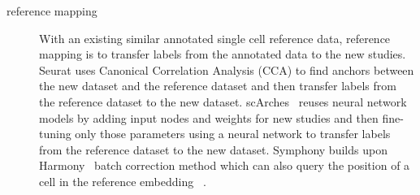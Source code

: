 \begin{description}
	\item[reference mapping] With an existing similar annotated single cell reference data, reference mapping is to transfer labels from the annotated data to the new studies. Seurat uses Canonical Correlation Analysis (CCA) to find anchors between the new dataset and the reference dataset and then transfer labels from the reference dataset to the new dataset. scArches~\citep{lotfollahi2022scarches} reuses neural network models by adding input nodes and weights for new studies and then fine-tuning only those parameters using a neural network to transfer labels from the reference dataset to the new dataset. Symphony builds upon Harmony~\citep{korsunsky2019harmony} batch correction method which can also query the position of a cell in the reference embedding ~\citep{kang2021symphony}.  
\end{description}

